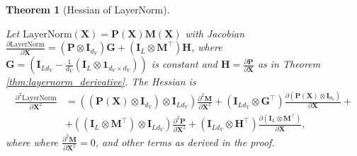 \documentclass{article}
\newtheorem{theorem}{Theorem} %
\begin{document}
\begin{theorem} [Hessian of LayerNorm] \label{thm:layernorm_second_derivative}

    
    Let \(\text{LayerNorm}(\mathbf{X}) = \mathbf{P}(\mathbf{X}) \mathbf{M}(\mathbf{X})\) with Jacobian \(\frac{\partial \text{LayerNorm}}{\partial \mathbf{X}} = (\mathbf{P} \otimes \mathbf{I}_{d_V}) \mathbf{G} + (\mathbf{I}_L \otimes \mathbf{M}^\top) \mathbf{H}\), where \(\mathbf{G} = \left(\mathbf{I}_{Ld_V} - \tfrac{1}{d_V}(\mathbf{I}_L \otimes \mathbf{1}_{d_V \times d_V})\right)\) is constant and \(\mathbf{H} = \frac{\partial \mathbf{P}}{\partial \mathbf{X}}\) as in Theorem \ref{thm:layernorm_derivative}. The Hessian is
\begin{align*}
\frac{\partial^2 \text{LayerNorm}}{\partial \mathbf{X}^2} &= \left( (\mathbf{P}(\mathbf{X}) \otimes \mathbf{I}_{d_V}) \otimes \mathbf{I}_{L d_V} \right)\frac{\partial^2 \mathbf{M}}{\partial \mathbf{X}^2} + \left( \mathbf{I}_{L d_V} \otimes \mathbf{G}^\top \right) \frac{\partial (\mathbf{P}(\mathbf{X}) \otimes \mathbf{I}_{d_V})}{\partial \mathbf{X}} + \\
&+ \left( (\mathbf{I}_L \otimes \mathbf{M}^\top ) \otimes \mathbf{I}_{L d_V} \right) \frac{\partial^2 \mathbf{P}}{\partial \mathbf{X}^2} + \left( \mathbf{I}_{L d_V} \otimes \mathbf{H}^\top \right) \frac{\partial (\mathbf{I}_L \otimes \mathbf{M}^\top )}{\partial\mathbf{X}},
\end{align*}
where
where \(\frac{\partial^2 \mathbf{M}}{\partial \mathbf{X}^2} = 0\), and other terms as derived in the proof. 


\end{theorem}
\end{document}
